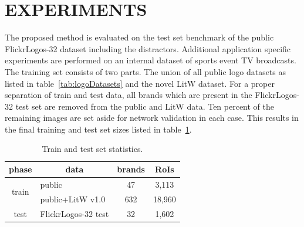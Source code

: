 \documentclass[a4paper,twoside]{article}
\begin{document}
\section{\uppercase{Experiments}}
%
\noindent The proposed method is evaluated on the test set benchmark of the public FlickrLogos-32 dataset including the distractors. Additional application specific experiments are performed on an internal dataset of sports event TV broadcasts. 
The training set consists of two parts. The union of all public logo datasets as listed in table~\ref{tab:logoDatasets} and the novel \ac{LitW} dataset. For a proper separation of train and test data, all brands which are present in the FlickrLogos-32 test set are removed from the public and \ac{LitW} data. Ten percent of the remaining images are set aside for network validation in each case. This results in the final training and test set sizes listed in table~\ref{tab:trainTestStatistics}.
%
\begin{table}[t]
\centering
\begingroup	
\setlength{\tabcolsep}{6pt}
\caption{Train and test set statistics.}
\label{tab:trainTestStatistics}
\begin{small}
\begin{tabular}{cl|cc}
\textbf{phase} & \multicolumn{1}{c|}{\textbf{data}} & \multicolumn{1}{c}{\textbf{brands}} & \multicolumn{1}{c}{\textbf{RoIs}} \bigstrut[b]\\
\hline
\multirow{2}[2]{*}{train} & public & 47    & 3,113 \bigstrut[t]\\
      & public+\ac{LitW} v1.0 & 632   & 18,960 \bigstrut[b]\\
\hline
test  & FlickrLogos-32 test & 32    & 1,602 \bigstrut[t]\\
\end{tabular}%
\end{small}
\endgroup
\end{table}
\end{document}
